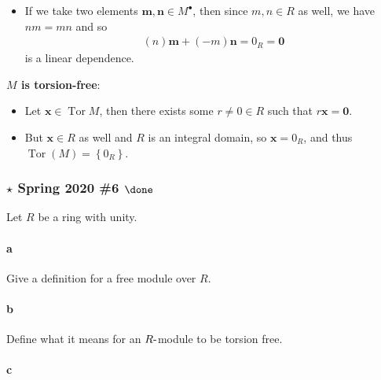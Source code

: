 \begin{solution}
\begin{itemize}
  \begin{itemize}
  \tightlist
  \item
    If we take two elements \(\mathbf{m}, \mathbf{n} \in M^{\bullet}\),
    then since \(m, n\in R\) as well, we have \(nm = mn\) and so
    \begin{align*}
    (n)\mathbf{m} + (-m)\mathbf{n} = 0_R = \mathbf{0}
    \end{align*}
    is a linear dependence.
  \end{itemize}
\end{itemize}

\textbf{\(M\) is torsion-free}:

\begin{itemize}
\item
  Let \(\mathbf{x} \in \operatorname{Tor}M\), then there exists some
  \(r\neq 0\in R\) such that \(r\mathbf{x} = \mathbf{0}\).
\item
  But \(\mathbf{x}\in R\) as well and \(R\) is an integral domain, so
  \(\mathbf{x}=0_R\), and thus
  \(\operatorname{Tor}(M) = \left\{{0_R}\right\}\).
\end{itemize}

\end{solution}

\hypertarget{star-spring-2020-6-done}{%
\subsubsection{\texorpdfstring{\(\star\) Spring 2020 \#6
\(\done\)}{\textbackslash star Spring 2020 \#6 \textbackslash done}}\label{star-spring-2020-6-done}}

Let \(R\) be a ring with unity.

\hypertarget{a-91}{%
\paragraph{a}\label{a-91}}

Give a definition for a free module over \(R\).

\hypertarget{b-81}{%
\paragraph{b}\label{b-81}}

Define what it means for an \(R{\hbox{-}}\)module to be torsion free.

\hypertarget{c-53}{%
\paragraph{c}\label{c-53}}

